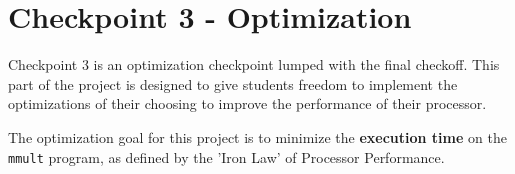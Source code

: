 \documentclass[11pt]{article}
\begin{document}



\newpage
\section{Checkpoint 3 - Optimization}

Checkpoint 3 is an optimization checkpoint lumped with the final checkoff.
This part of the project is designed to give students freedom to implement the optimizations of their choosing to improve the performance of their processor.

The optimization goal for this project is to minimize the \textbf{execution time} on the \verb|mmult| program, as defined by the 'Iron Law' of Processor Performance.
\end{document}
